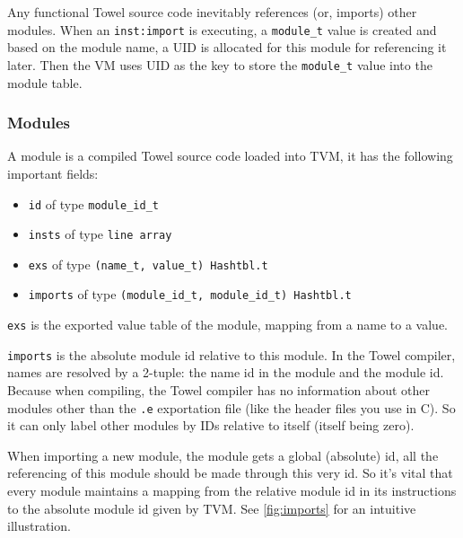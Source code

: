 \documentclass{article}
\newcommand{\inst}[1] {\texttt{inst:#1}}
\begin{document}
Any functional Towel source code inevitably references (or, imports) other modules. When an \inst{import} is executing, a \texttt{module\_t} value is created and based on the module name, a UID is allocated for this module for referencing it later. Then the VM uses UID as the key to store the \texttt{module\_t} value into the module table.

\subsubsection{Modules}

A module is a compiled Towel source code loaded into TVM, it has the following important fields:
\begin{itemize}
\item \texttt{id} of type \texttt{module\_id\_t}
\item \texttt{insts} of type \texttt{line array}
\item \texttt{exs} of type \texttt{(name\_t, value\_t) Hashtbl.t}
\item \texttt{imports} of type \texttt{(module\_id\_t, module\_id\_t) Hashtbl.t}
\end{itemize}

\texttt{exs} is the exported value table of the module, mapping from a name to a value.

\texttt{imports} is the absolute module id relative to this module. In the Towel compiler, names are resolved by a 2-tuple: the name id in the module and the module id. Because when compiling, the Towel compiler has no information about other modules other than the \texttt{.e} exportation file (like the header files you use in C). So it can only label other modules by IDs relative to itself (itself being zero).

When importing a new module, the module gets a global (absolute) id, all the referencing of this module should be made through this very id. So it's vital that every module maintains a mapping from the relative module id in its instructions to the absolute module id given by TVM. See \ref{fig:imports} for an intuitive illustration.
\end{document}
